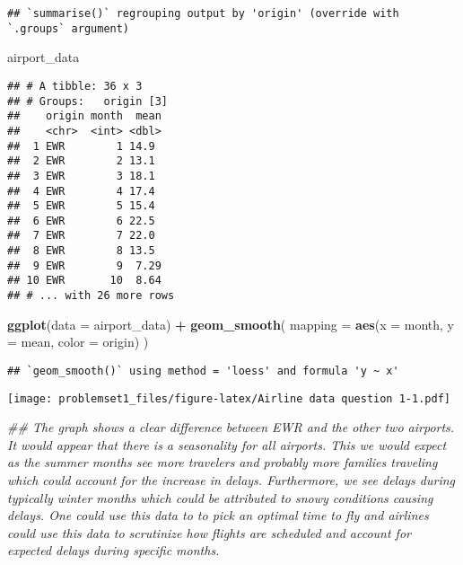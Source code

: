 \documentclass[
]{article}
\newenvironment{Shaded}{\begin{snugshade}}{\end{snugshade}}
\newcommand{\CommentTok}[1]{\textcolor[rgb]{0.56,0.35,0.01}{\textit{#1}}}
\newcommand{\DataTypeTok}[1]{\textcolor[rgb]{0.13,0.29,0.53}{#1}}
\newcommand{\KeywordTok}[1]{\textcolor[rgb]{0.13,0.29,0.53}{\textbf{#1}}}
\newcommand{\NormalTok}[1]{#1}
\newcommand{\OperatorTok}[1]{\textcolor[rgb]{0.81,0.36,0.00}{\textbf{#1}}}
\newcommand{\StringTok}[1]{\textcolor[rgb]{0.31,0.60,0.02}{#1}}
\begin{document}
\begin{verbatim}
## `summarise()` regrouping output by 'origin' (override with `.groups` argument)
\end{verbatim}

\begin{Shaded}
\begin{Highlighting}[]
\NormalTok{airport_data}
\end{Highlighting}
\end{Shaded}

\begin{verbatim}
## # A tibble: 36 x 3
## # Groups:   origin [3]
##    origin month  mean
##    <chr>  <int> <dbl>
##  1 EWR        1 14.9 
##  2 EWR        2 13.1 
##  3 EWR        3 18.1 
##  4 EWR        4 17.4 
##  5 EWR        5 15.4 
##  6 EWR        6 22.5 
##  7 EWR        7 22.0 
##  8 EWR        8 13.5 
##  9 EWR        9  7.29
## 10 EWR       10  8.64
## # ... with 26 more rows
\end{verbatim}

\begin{Shaded}
\begin{Highlighting}[]
\KeywordTok{ggplot}\NormalTok{(}\DataTypeTok{data =}\NormalTok{ airport_data) }\OperatorTok{+}
\StringTok{  }\KeywordTok{geom_smooth}\NormalTok{(}
    \DataTypeTok{mapping =} \KeywordTok{aes}\NormalTok{(}\DataTypeTok{x =}\NormalTok{ month, }\DataTypeTok{y =}\NormalTok{ mean, }\DataTypeTok{color =}\NormalTok{ origin)}
\NormalTok{  )}
\end{Highlighting}
\end{Shaded}

\begin{verbatim}
## `geom_smooth()` using method = 'loess' and formula 'y ~ x'
\end{verbatim}

\texttt{[image: problemset1\_files/figure-latex/Airline data question 1-1.pdf]}

\begin{Shaded}
\begin{Highlighting}[]
\CommentTok{## The graph shows a clear difference between EWR and the other two airports. It would appear that there is a seasonality for all airports. This we would expect as the summer months see more travelers and probably more families traveling which could account for the increase in delays. Furthermore, we see delays during typically winter months which could be attributed to snowy conditions causing delays. One could use this data to to pick an optimal time to fly and airlines could use this data to scrutinize how flights are scheduled and account for expected delays during specific months.}
\end{Highlighting}
\end{Shaded}
\end{document}
